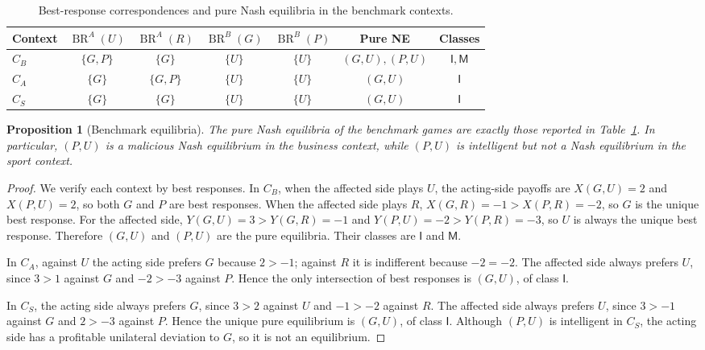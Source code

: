 \documentclass[a4paper,fleqn]{cas-dc}
\newtheorem{proposition}[definition]{Proposition}
\theoremstyle{remark}
\newcommand{\Iclass}{\mathsf{I}}
\newcommand{\Mclass}{\mathsf{M}}
\newcommand{\BR}{\operatorname{BR}}
\begin{document}
\begin{table}[t]
\centering
\small
\begin{tabular}{lcccccc}
\toprule
Context & $\BR^A(U)$ & $\BR^A(R)$ & $\BR^B(G)$ & $\BR^B(P)$ & Pure NE & Classes\\
\midrule
$C_B$ & $\{G,P\}$ & $\{G\}$ & $\{U\}$ & $\{U\}$ & $(G,U),(P,U)$ & $\Iclass,\Mclass$\\
$C_A$ & $\{G\}$ & $\{G,P\}$ & $\{U\}$ & $\{U\}$ & $(G,U)$ & $\Iclass$\\
$C_S$ & $\{G\}$ & $\{G\}$ & $\{U\}$ & $\{U\}$ & $(G,U)$ & $\Iclass$\\
\bottomrule
\end{tabular}
\caption{Best-response correspondences and pure Nash equilibria in the benchmark contexts.}
\label{tab:br-ne}
\end{table}

\begin{proposition}[Benchmark equilibria]
\label{prop:benchmark-equilibria}
The pure Nash equilibria of the benchmark games are exactly those reported in Table~\ref{tab:br-ne}. In particular, $(P,U)$ is a malicious Nash equilibrium in the business context, while $(P,U)$ is intelligent but not a Nash equilibrium in the sport context.
\end{proposition}

\begin{proof}
We verify each context by best responses. In $C_B$, when the affected side plays $U$, the acting-side payoffs are $X(G,U)=2$ and $X(P,U)=2$, so both $G$ and $P$ are best responses. When the affected side plays $R$, $X(G,R)=-1>X(P,R)=-2$, so $G$ is the unique best response. For the affected side, $Y(G,U)=3>Y(G,R)=-1$ and $Y(P,U)=-2>Y(P,R)=-3$, so $U$ is always the unique best response. Therefore $(G,U)$ and $(P,U)$ are the pure equilibria. Their classes are $\Iclass$ and $\Mclass$.

In $C_A$, against $U$ the acting side prefers $G$ because $2>-1$; against $R$ it is indifferent because $-2=-2$. The affected side always prefers $U$, since $3>1$ against $G$ and $-2>-3$ against $P$. Hence the only intersection of best responses is $(G,U)$, of class $\Iclass$.

In $C_S$, the acting side always prefers $G$, since $3>2$ against $U$ and $-1>-2$ against $R$. The affected side always prefers $U$, since $3>-1$ against $G$ and $2>-3$ against $P$. Hence the unique pure equilibrium is $(G,U)$, of class $\Iclass$. Although $(P,U)$ is intelligent in $C_S$, the acting side has a profitable unilateral deviation to $G$, so it is not an equilibrium.
\end{proof}
\end{document}
